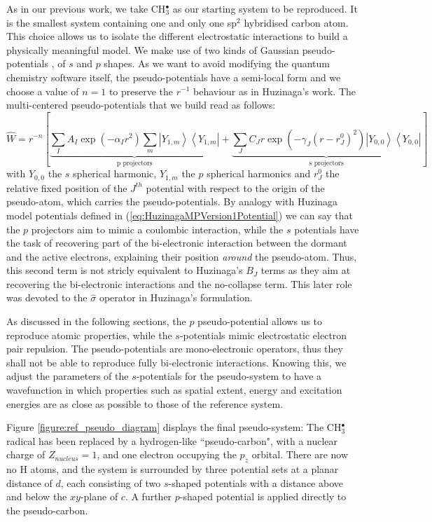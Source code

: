 \documentclass[12pt]{article}
\begin{document}
As in our previous work\cite{drujon_pseudopotentials_2013},
we take CH\(^{\bullet}_{3}\) as our starting system to be reproduced.
It is the smallest system containing one and only one sp$^2$ hybridised carbon atom. This choice allows us to isolate the different electrostatic interactions to build a physically meaningful model. We make use of two kinds of Gaussian pseudo-potentials \cite{me_structure_theory}, of \(s\) and \(p\) shapes. As we want to avoid modifying the quantum chemistry software itself, the pseudo-potentials have a semi-local form and we choose a value of \(n = 1\) to preserve the \(r^{-1}\) behaviour as in Huzinaga's work.
The multi-centered pseudo-potentials that we build read as follows:
\begin{equation}
\label{eq:ourPP}
\hat{W} = r^{-n}\left[%
\underbrace{\sum_IA_I\exp(-\alpha_I r^2)\sum_m\left|Y_{1,m}\right>\left<Y_{1,m}\right|}_{\text{p projectors}}%
+%
\underbrace{\sum_JC_Jr\exp(-\gamma_J (r-r^0_J)^2)\left|Y_{0,0}\right>\left<Y_{0,0}\right|}_{\text{s projectors}}%
\right]
\end{equation}
with $Y_{0,0}$ the $s$ spherical harmonic, $Y_{1,m}$ the $p$ spherical harmonics and $r^0_J$ the relative fixed position of the $J^{th}$ potential with respect to the origin of the pseudo-atom, which carries the pseudo-potentials.
By analogy with Huzinaga model potentials defined in (\ref{eq:HuzinagaMPVersion1Potential})
we can say that the $p$ projectors aim to mimic a coulombic interaction,
while the $s$ potentials have the task of recovering part of the bi-electronic interaction
between the dormant and the active electrons, explaining their position \textit{around} the pseudo-atom.
Thus, this second term is not stricly equivalent to Huzinaga's $B_J$ terms as they aim at recovering
the bi-electronic interactions and the no-collapse term.
This later role was devoted to the $\hat{\sigma}$ operator in Huzinaga's formulation.

As discussed in the following sections,
the \(p\) pseudo-potential allows us to reproduce atomic properties, while the \(s\)-potentials mimic electrostatic electron pair repulsion.
The pseudo-potentials are mono-electronic operators, thus they shall not be able to reproduce fully bi-electronic interactions.
Knowing this, we adjust the parameters of the \(s\)-potentials for the pseudo-system to have a wavefunction in which properties such as spatial extent, energy and excitation energies are as close as possible to those of the reference system.

Figure \ref{figure:ref_pseudo_diagram} displays the final pseudo-system: The CH\(^{\bullet}_{3}\) radical has been replaced by a hydrogen-like ``pseudo-carbon", with a nuclear charge of \(Z_{nucleus} = 1\), and one electron occupying the \(p_{z}\) orbital. 
There are now no H atoms, and the system is surrounded by three potential sets at a planar distance of \(d\), each consisting of 
two \(s\)-shaped potentials with a distance above and below the \(xy\)-plane of \(c\). A further \(p\)-shaped potential is applied
directly to the pseudo-carbon.
\end{document}
